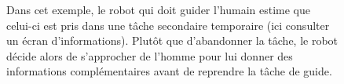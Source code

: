 \documentclass[a4paper,11pt,twoside]{StyleThese}
\begin{document}
 \begin{figure}[ht!]
  \begin{center}
 \end{center}
  \caption{Dans cet exemple, le robot qui doit guider l'humain estime que celui-ci est pris dans une tâche secondaire temporaire (ici consulter un écran d'informations). Plutôt que d'abandonner la tâche, le robot décide alors de s'approcher de l'homme pour lui donner des informations complémentaires avant de reprendre la tâche de guide.}
  \label{fig:screen}
\end{figure}

 
\end{document}
